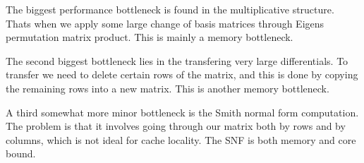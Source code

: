 \begin{DoxyItemize}
\item The biggest performance bottleneck is found in the multiplicative structure. That\textquotesingle{}s when we apply some large change of basis matrices through Eigen\textquotesingle{}s permutation matrix product. This is mainly a memory bottleneck.
\item The second biggest bottleneck lies in the transfering very large differentials. To transfer we need to delete certain rows of the matrix, and this is done by copying the remaining rows into a new matrix. This is another memory bottleneck.
\item A third somewhat more minor bottleneck is the Smith normal form computation. The problem is that it involves going through our matrix both by rows and by columns, which is not ideal for cache locality. The S\+NF is both memory and core bound. 
\end{DoxyItemize}